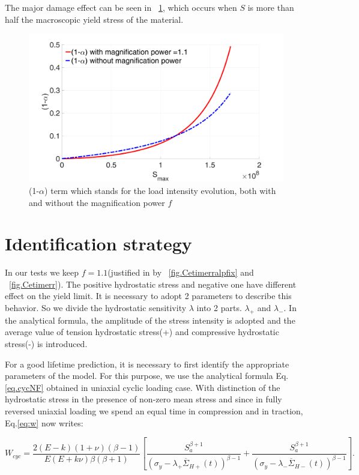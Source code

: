 \documentclass[3p,times,procedia,number]{elsarticle}
\newcommand{\figref}[1]{\figurename~\ref{#1}}
\begin{document}
The major damage effect can be seen in \figref{fig.SmaxSequence}, which occurs when $S$ is more than half the macroscopic yield stress of the material.

\begin{figure}[!h]
	\centering
	\includegraphics[width=\textwidth]{figures//alp_Smax_fb.png} 
	\caption{(1-$\alpha$) term which stands for the load intensity evolution, both with and without the magnification power $f$}
	\label{fig.SmaxSequence}
\end{figure}

\clearpage
\section{Identification strategy}
\label{sec:5.9}
In our tests we keep $f=1.1$(justified in by \figref{fig.Cetimerralpfix} and \figref{fig.Cetimerr}). The positive hydrostatic stress and negative one have different effect on the yield limit. It is necessary to adopt 2 parameters to describe this behavior. So we divide the hydrostatic sensitivity $\lambda$ into 2 parts. $\lambda_+$ and $\lambda_-$. In the analytical formula, the amplitude of the stress intensity is adopted and the average value of tension hydrostatic stress(+) and compressive hydrostatic stress(-) is introduced.

For a good lifetime prediction, it is necessary to first identify the appropriate parameters of the model. For this purpose, we use the analytical formula Eq.\eqref{eq.cycNF} obtained in uniaxial cyclic loading case. With distinction of the hydrostatic stress in the presence of non-zero mean stress and since in fully reversed uniaxial loading we spend an equal time in compression and in traction, Eq.\eqref{eq:w} now writes:

\begin{equation}
W_{cyc}=\dfrac{2(E-k)(1+\nu)\left( \beta-1\right) }{ E(E+k\nu)\beta\left( \beta+1\right) }\left[ \dfrac{S_{a}^{\beta+1}}{ \left(\sigma_y-\lambda_+ \overline{\Sigma}_{H+}(t)\right)^{\beta-1}}+\dfrac{S_{a}^{\beta+1}}{ \left(\sigma_y-\lambda_- \overline{\Sigma}_{H-}(t)\right)^{\beta-1}}\right] .
\label{eq:wcycnew}
\end{equation}
\end{document}
